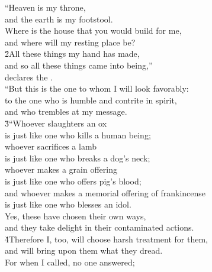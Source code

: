 \begin{poetry}
\poeml ``Heaven is my throne, \\
\poemll    and the earth is my footstool. \\
\poeml Where is the house that you would build for me, \\
\poemll    and where will my resting place be? \\
\poeml \v{2}All these things my hand has made, \\
\poemll    and so all these things came into being,'' \\
\poemlll       declares the . \\
\poeml ``But this is the one to whom I will look favorably: \\
\poemll    to the one who is humble and contrite in spirit, \\
\poemlll       and who trembles at my message. \\
\poeml \v{3}``Whoever slaughters an ox \\
\poemll    is just like one who kills a human being; \\
\poeml whoever sacrifices a lamb \\
\poemll    is just like one who breaks a dog's neck; \\
\poeml whoever makes a grain offering \\
\poemll    is just like one who offers pig's blood; \\
\poeml and whoever makes a memorial offering of frankincense \\
\poemll    is just like one who blesses an idol. \\
\poeml Yes, these have chosen their own ways, \\
\poemll    and they take delight in their contaminated actions. \\
\poeml \v{4}Therefore I, too, will choose harsh treatment for them, \\
\poemll    and will bring upon them what they dread. \\
\poeml For when I called, no one answered; \\

\end{poetry}
